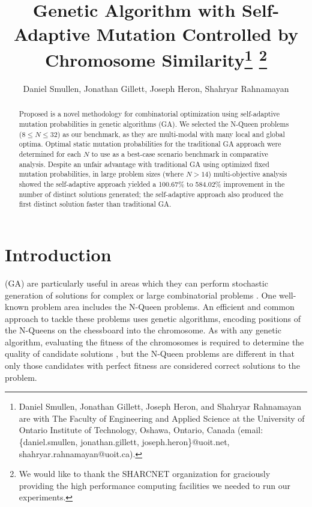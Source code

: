 \documentclass[conference]{IEEEtran}
\begin{document}
\title{\ \\ \LARGE\bf Genetic Algorithm with Self-Adaptive Mutation Controlled by Chromosome Similarity\thanks{Daniel Smullen, Jonathan Gillett, Joseph Heron, and Shahryar Rahnamayan are with The Faculty of Engineering and Applied Science at the University of Ontario Institute of Technology, Oshawa, Ontario, Canada (email: \{daniel.smullen, jonathan.gillett, joseph.heron\}@uoit.net, shahryar.rahnamayan@uoit.ca).} \thanks{We would like to thank the SHARCNET organization for graciously providing the high performance computing facilities we needed to run our experiments.}}

\author{Daniel Smullen, Jonathan Gillett, Joseph Heron, Shahryar Rahnamayan}


\maketitle

\begin{abstract}
Proposed is a novel methodology for combinatorial optimization using self-adaptive mutation probabilities in genetic algorithms (GA). We selected the N-Queen problems ($8 \leq N \leq 32$) as our benchmark, as they are multi-modal with many local and global optima. Optimal static mutation probabilities for the traditional GA approach were determined for each $N$ to use as a best-case scenario benchmark in comparative analysis. Despite an unfair advantage with traditional GA using optimized fixed mutation probabilities, in large problem sizes (where $N > 14$) multi-objective analysis showed the self-adaptive approach yielded a 100.67\% to 584.02\% improvement in the number of distinct solutions generated; the self-adaptive approach also produced the first distinct solution faster than traditional GA.
\end{abstract}


\section{Introduction}
 (GA) are particularly useful in areas which they can perform stochastic generation of solutions for complex or large combinatorial problems \cite{cit:1,cit:2}. One well-known problem area includes the N-Queen problems. An efficient and common approach to tackle these problems uses genetic algorithms, encoding positions of the N-Queens on the chessboard into the chromosome. As with any genetic algorithm, evaluating the fitness of the chromosomes is required to determine the quality of candidate solutions \cite{cit:8}, but the N-Queen problems are different in that only those candidates with perfect fitness are considered correct solutions to the problem. 
\end{document}
